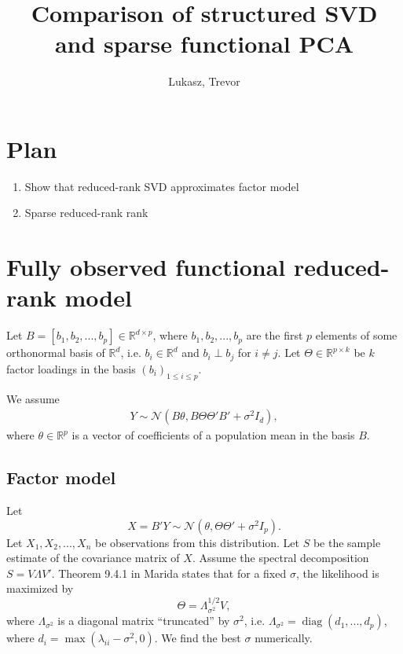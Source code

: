 \documentclass{article}
\title{Comparison of structured SVD\\ and sparse functional PCA}
\author{Lukasz, Trevor}
\newcommand{\cN}{\mathcal{N}}
\newcommand{\R}{\mathbb{R}}
\DeclareMathOperator*{\diag}{diag}
\begin{document}
\maketitle

\section*{Plan}

\begin{enumerate}
  \item Show that reduced-rank SVD approximates factor model
  \item Sparse reduced-rank rank
\end{enumerate}

\section{Fully observed functional reduced-rank model}
Let $B = [b_1,b_2,...,b_p] \in \R^{d \times p}$, where $b_1, b_2, ..., b_p$ are the first $p$ elements of some orthonormal basis of $\R^d$, i.e. $b_i \in \R^d$ and $b_i \perp b_j$ for $i \neq j$. Let $\Theta \in \R^{p \times k}$ be $k$ factor loadings in the basis $(b_i)_{1 \leq i \leq p}$.

We assume 
\begin{align}\label{eq:model}
  Y \sim \cN(B\theta, B \Theta \Theta' B' + \sigma^2 I_d),
\end{align}
where $\theta \in \R^{p}$ is a vector of coefficients of a population mean in the basis $B$. %
\subsection{Factor model}
Let
\begin{equation}
X = B'Y \sim \cN(\theta, \Theta \Theta' + \sigma^2 I_p).\label{model:x}
\end{equation}
Let $X_1,X_2,...,X_n$ be observations from this distribution.
Let $S$ be the sample estimate of the covariance matrix of $X$. Assume the spectral decomposition $S = V \Lambda V'$.
Theorem 9.4.1 in Marida states that for a fixed $\sigma$, the likelihood is maximized by
\[
 \Theta = \Lambda_{\sigma^2} ^{1/2}V,
\]
where $\Lambda_{\sigma^2}$ is a diagonal matrix ``truncated'' by $\sigma^2$, i.e. $\Lambda_{\sigma^2} = \diag(d_1,...,d_p)$, where $d_{i} = \max(\lambda_{ii} - \sigma^2,0)$. We find the best $\sigma$ numerically.
\end{document}
